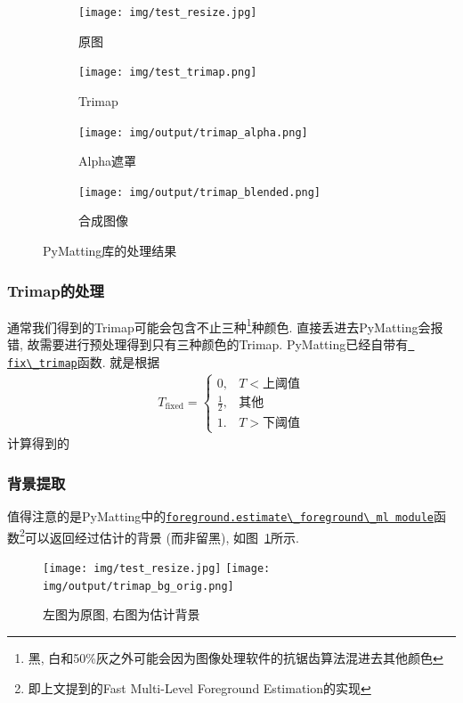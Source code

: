 \documentclass[scheme=chinese,a4paper]{article}
\begin{document}
\begin{figure}[H]
  \centering
  \begin{subfigure}{0.23\textwidth}
    \centering
    \texttt{[image: img/test\_resize.jpg]}
    \caption{原图}
  \end{subfigure}
  \begin{subfigure}{0.23\textwidth}
    \centering
    \texttt{[image: img/test\_trimap.png]}
    \caption{Trimap}
  \end{subfigure}
  \begin{subfigure}{0.23\textwidth}
    \centering
    \texttt{[image: img/output/trimap\_alpha.png]}
    \caption{Alpha遮罩}
  \end{subfigure}
  \begin{subfigure}{0.23\textwidth}
    \centering
    \texttt{[image: img/output/trimap\_blended.png]}
    \caption{合成图像}
  \end{subfigure}

  \caption{PyMatting库的处理结果}
  \end{figure}


\subsubsection{Trimap的处理}
通常我们得到的Trimap可能会包含不止三种\footnote{黑, 白和50\%灰之外可能会因为图像处理软件的抗锯齿算法混进去其他颜色}种颜色. 直接丢进去PyMatting会报错, 故需要进行预处理得到只有三种颜色的Trimap. 
PyMatting已经自带有\href{https://pymatting.github.io/pymatting.util.html?highlight=trimap\#pymatting.util.util.fix\_trimap}{\lstinline{ fix\_trimap}}函数. 就是根据
\begin{align*}
  T_{\text{fixed}}=\begin{cases}
    0, &T<\text{上阈值}\\
    \frac{1}{2},&\text{其他}\\
    1. &T>\text{下阈值}
  \end{cases}
\end{align*}
计算得到的
\subsubsection{背景提取}
值得注意的是PyMatting中的\href{https://pymatting.github.io/pymatting.foreground.html?highlight=estimate\#module-pymatting.foreground.estimate\_foreground\_ml}{\lstinline{foreground.estimate\_foreground\_ml module}}函数\footnote{即上文提到的Fast Multi-Level Foreground Estimation的实现}可以返回经过估计的背景 (而非留黑), 如图~\ref{fig:pym_bg}所示.  
\begin{figure}[H]
\centering
\texttt{[image: img/test\_resize.jpg]}
\texttt{[image: img/output/trimap\_bg\_orig.png]}
\caption{左图为原图, 右图为估计背景}
\label{fig:pym_bg}
\end{figure}
\end{document}
